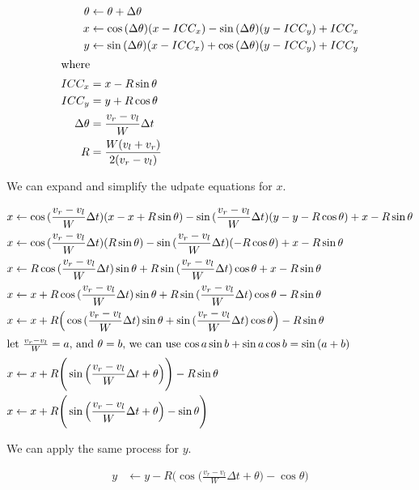 \documentclass{article}
\begin{document}
\begin{align}
 \theta &\leftarrow \theta + \Delta\theta \\
  x &\leftarrow \cos{(\Delta\theta)}(x-ICC_x)-\sin{(\Delta\theta)}(y-ICC_y) + ICC_x \\
  y &\leftarrow \sin{(\Delta\theta)}(x-ICC_x)+\cos{(\Delta\theta)}(y-ICC_y) + ICC_y \\
\shortintertext{where}
  ICC_x &= x-R\sin{\theta} \\
  ICC_y &= y+R\cos{\theta} \\
  \Delta\theta &= \frac{v_r-v_l}{W}\Delta t \\
  R &= \frac{W(v_l+v_r)}{2(v_r-v_l)}
\end{align}

We can expand and simplify the udpate equations for $x$.

\begin{align}
  x &\leftarrow \cos{(\frac{v_r-v_l}{W}\Delta t)}(x-x+R\sin{\theta})-\sin{(\frac{v_r-v_l}{W}\Delta t)}(y-y-R\cos{\theta}) + x-R\sin{\theta} \\
  x &\leftarrow \cos{(\frac{v_r-v_l}{W}\Delta t)}(R\sin{\theta})-\sin{(\frac{v_r-v_l}{W}\Delta t)}(-R\cos{\theta}) + x-R\sin{\theta} \\
  x &\leftarrow R\cos{(\frac{v_r-v_l}{W}\Delta t)}\sin{\theta}+R\sin{(\frac{v_r-v_l}{W}\Delta t)}\cos{\theta} + x-R\sin{\theta} \\
  x &\leftarrow x+R\cos{(\frac{v_r-v_l}{W}\Delta t)}\sin{\theta}+R\sin{(\frac{v_r-v_l}{W}\Delta t)}\cos{\theta}-R\sin{\theta} \\
  x &\leftarrow x+R\Big(\cos{(\frac{v_r-v_l}{W}\Delta t)}\sin{\theta}+\sin{(\frac{v_r-v_l}{W}\Delta t)}\cos{\theta}\Big)-R\sin{\theta} \\
  \shortintertext{let $\frac{v_r-v_l}{W}=a$, and $\theta=b$, we can use $\cos{a}\sin{b}+\sin{a}\cos{b}=\sin{(a+b)}$}
  x &\leftarrow x+R\Bigg(\sin{\Big(\frac{v_r-v_l}{W}\Delta t+\theta}\Big)\Bigg)-R\sin{\theta} \\
  x &\leftarrow x+R\Bigg(\sin{\Big(\frac{v_r-v_l}{W}\Delta t+\theta}\Big)-\sin{\theta}\Bigg) \\
\end{align}

We can apply the same process for $y$.

\begin{align}
  y &\leftarrow y-R\Bigg(\cos{\Big(\frac{v_r-v_l}{W}\Delta t+\theta\Big)}-\cos{\theta}\Bigg)
\end{align}
\end{document}
